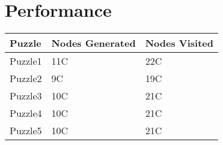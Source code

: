 \documentclass{article}
\begin{document}
\section*{Performance}
\begin{center}
    \begin{tabular}{ | l | l | l | }
    \hline
    Puzzle & Nodes Generated & Nodes Visited  \\ \hline
    Puzzle1 & 11C & 22C   \\ \hline
    Puzzle2 & 9C & 19C  \\ \hline
    Puzzle3 & 10C & 21C \\ \hline
    Puzzle4 & 10C & 21C \\ \hline
    Puzzle5 & 10C & 21C \\ \hline

    \end{tabular}
\end{center}
\end{document}
